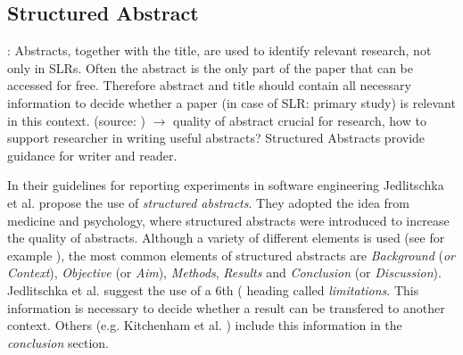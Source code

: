 \subsection{Structured Abstract}
\label{subsec:structured abstract}

: Abstracts, together with the title, are used to identify relevant research, not only in SLRs. Often the abstract is the only part of the paper that can be accessed for free. Therefore abstract and title should contain all necessary information to decide whether a paper (in case of SLR: primary study) is relevant in this context. (source: )
	$\rightarrow$ quality of abstract crucial for research, how to support researcher in writing useful abstracts? Structured Abstracts provide guidance for writer and reader. 
\newline

In their guidelines for reporting experiments in software engineering Jedlitschka et al. \cite{Jedlitschka2008} propose the use of \emph{structured abstracts}. They adopted the idea from medicine and psychology, where structured abstracts were introduced to increase the quality of abstracts. Although a variety of different elements is used (see for example ), the most common elements of structured abstracts are \emph{Background} (\emph{or Context}), \emph{Objective} (or \emph{Aim}), \emph{Methods}, \emph{Results} and \emph{Conclusion} (or \emph{Discussion}). Jedlitschka et al. \cite{Jedlitschka2008} suggest the use of a 6th ( heading called \emph{limitations}. This information is necessary to decide whether a result can be transfered to another context. Others  (e.g. Kitchenham et al. \cite{KBO2008}) include this information in the \emph{conclusion} section.

